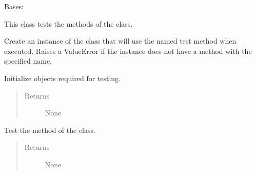 \documentclass[letterpaper,10pt,english]{sphinxmanual}
\begin{document}

\begin{fulllineitems}
\label{\detokenize{farming:farming.farm1.TestFarm}}
\sphinxAtStartPar
Bases: 

\sphinxAtStartPar
This class tests the methods of the {\hyperref[\detokenize{farming:farming.farm1.Farm}]{}} class.

\sphinxAtStartPar
Create an instance of the class that will use the named test
method when executed. Raises a ValueError if the instance does
not have a method with the specified name.

\begin{fulllineitems}
\label{\detokenize{farming:farming.farm1.TestFarm.setUp}}
\sphinxAtStartPar
Initialize objects required for testing.
\begin{quote}\begin{description}
\item[{Returns}] \leavevmode
\sphinxAtStartPar
None

\end{description}\end{quote}

\end{fulllineitems}


\begin{fulllineitems}
\label{\detokenize{farming:farming.farm1.TestFarm.test_add_cow}}
\sphinxAtStartPar
Test the {\hyperref[\detokenize{farming:farming.farm1.Farm.add_cow}]{}} method of the {\hyperref[\detokenize{farming:farming.farm1.Farm}]{}} class.
\begin{quote}\begin{description}
\item[{Returns}] \leavevmode
\sphinxAtStartPar
None


\end{description}
\end{quote}
\end{fulllineitems}
\end{fulllineitems}
\end{document}
